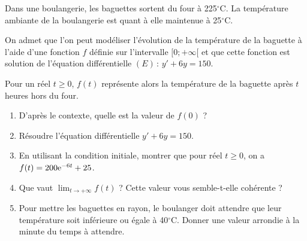 \documentclass[11pt,fleqn, openany]{book} %
\begin{document}
\begin{exercise}
Dans une boulangerie, les baguettes sortent du four à 225$^{\circ}$C. La température ambiante de la boulangerie est quant à elle maintenue à 25$^{\circ}$C. 

On admet que l'on peut modéliser l'évolution de la température de la baguette à l'aide d'une fonction $f$ définie sur l'intervalle $[0;+\infty[$ et que cette fonction est solution de l'équation différentielle $(E)\, : \, y'+6y=150$.

Pour un réel $t\geqslant 0$, $f(t)$ représente alors la température de la baguette après $t$ heures hors du four.
\begin{enumerate}
\item D'après le contexte, quelle est la valeur de $f(0)$ ?
\item Résoudre l'équation différentielle $y'+6y=150$.
\item En utilisant la condition initiale, montrer que pour réel $t \geqslant 0$, on a $f(t)=200\mathrm{e}^{-6t}+25$.
\item Que vaut $\displaystyle\lim_{t \to + \infty}f(t)$ ? Cette valeur vous semble-t-elle cohérente ?
\item Pour mettre les baguettes en rayon, le boulanger doit attendre que leur température soit inférieure ou égale à 40$^{\circ}$C. Donner une valeur arrondie à la minute du temps à attendre. 
\end{enumerate}\end{exercise}
\end{document}
